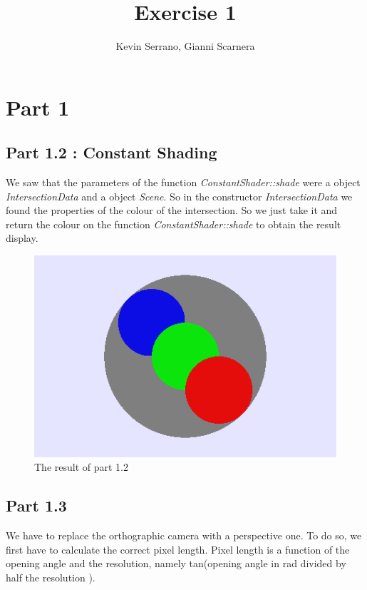 \documentclass[10pt,a4paper]{report}
\author{Kevin Serrano, Gianni Scarnera}
\title{Exercise 1}
\begin{document}
\maketitle

\section*{Part 1}
\subsection*{Part 1.2 : Constant Shading}
We saw that the parameters of the function \textit{ConstantShader::shade} were a object \textit{IntersectionData} and a object \textit{Scene}. So in the constructor \textit{IntersectionData} we found the properties of the colour of the intersection. So we just take it and return the colour on the function \textit{ConstantShader::shade} to obtain the result display.
\begin{figure}[h!]
\caption{The result of part 1.2}
  \centering
    \includegraphics[width=1\textwidth]{framework/Image1_2.png}
\end{figure}
\newpage
\subsection*{Part 1.3}
We have to replace the orthographic camera with a perspective one. To do so, we first have to calculate the correct pixel length. Pixel length is a function of the opening angle and the resolution, namely tan(opening angle in rad divided by half the resolution ).
\end{document}
